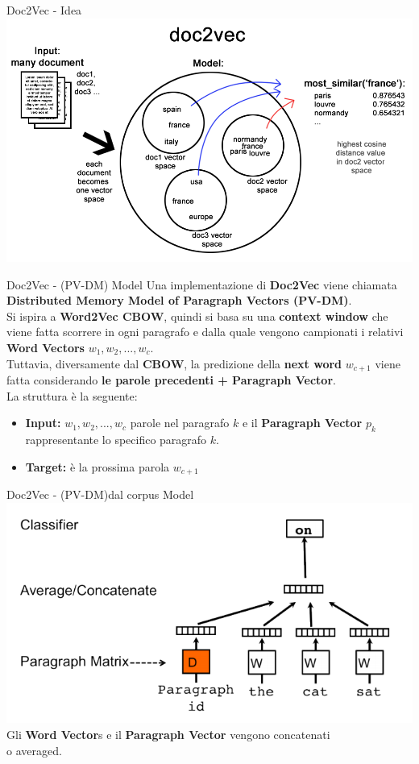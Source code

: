 \documentclass[british]{beamer}
\begin{document}
\begin{frame}{Doc2Vec - Idea}
	\includegraphics[width=\textwidth]{./Imgs/doc2vec-working.png}
\end{frame}

\begin{frame}{Doc2Vec - (PV-DM) Model}
	Una implementazione di \textbf{Doc2Vec} viene chiamata \textbf{Distributed Memory Model of Paragraph Vectors (PV-DM)}.\\
	Si ispira a \textbf{Word2Vec CBOW}, quindi si basa su una \textbf{context window} che viene fatta scorrere in ogni paragrafo e dalla quale vengono campionati i relativi \textbf{Word Vectors} $w_{1}, w_{2}, ...,w_{c}$.\\
	Tuttavia, diversamente dal \textbf{CBOW}, la predizione della \textbf{next word} $w_{c+1}$ viene fatta considerando \textbf{le parole precedenti + Paragraph Vector}.\\
	La struttura \`{e} la seguente:
	\begin{itemize}
		\item \textbf{Input:} $w_{1}, w_{2}, ...,w_{c}$ parole nel paragrafo $k$ e il \textbf{Paragraph Vector} $p_k $ rappresentante lo specifico paragrafo $k$.
		\item \textbf{Target:} \`{e} la prossima parola $w_{c+1}$
	\end{itemize}
\end{frame}

\begin{frame}{Doc2Vec - (PV-DM)dal corpus Model}
	\includegraphics[width= 0.9\linewidth]{./Imgs/d2v-cbow.png}
	\\Gli \textbf{Word Vector}s e il \textbf{Paragraph Vector} vengono concatenati\\ o averaged.
\end{frame}
\end{document}
